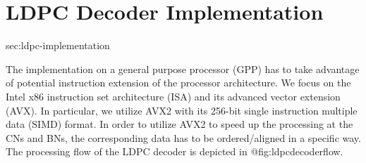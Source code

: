 \documentclass{article}
\begin{document}
\newpage
\section{LDPC Decoder Implementation}{sec:ldpc-implementation}

The implementation on a general purpose processor (GPP) has to take advantage of potential instruction extension of the processor architecture. We focus on the Intel x86 instruction set architecture (ISA) and its advanced vector extension (AVX). In particular, we utilize AVX2 with its 256-bit single instruction multiple data (SIMD) format. In order to utilize AVX2 to speed up the processing at the CNs and BNs, the corresponding data has to be ordered/aligned in a specific way. The processing flow of the LDPC decoder is depicted in {@fig:ldpcdecoderflow}.
\end{document}
